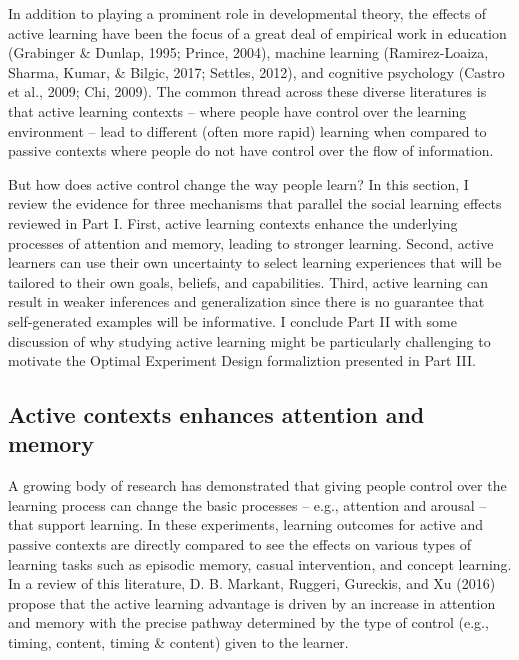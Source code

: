 \documentclass[english,floatsintext,man]{apa6}
\theoremstyle{definition}
\theoremstyle{definition}
\theoremstyle{definition}
\theoremstyle{remark}
\begin{document}
In addition to playing a prominent role in developmental theory, the
effects of active learning have been the focus of a great deal of
empirical work in education (Grabinger \& Dunlap, 1995; Prince, 2004),
machine learning (Ramirez-Loaiza, Sharma, Kumar, \& Bilgic, 2017;
Settles, 2012), and cognitive psychology (Castro et al., 2009; Chi,
2009). The common thread across these diverse literatures is that active
learning contexts -- where people have control over the learning
environment -- lead to different (often more rapid) learning when
compared to passive contexts where people do not have control over the
flow of information.

But how does active control change the way people learn? In this
section, I review the evidence for three mechanisms that parallel the
social learning effects reviewed in Part I. First, active learning
contexts enhance the underlying processes of attention and memory,
leading to stronger learning. Second, active learners can use their own
uncertainty to select learning experiences that will be tailored to
their own goals, beliefs, and capabilities. Third, active learning can
result in weaker inferences and generalization since there is no
guarantee that self-generated examples will be informative. I conclude
Part II with some discussion of why studying active learning might be
particularly challenging to motivate the Optimal Experiment Design
formaliztion presented in Part III.

\subsection{Active contexts enhances attention and
memory}\label{active-contexts-enhances-attention-and-memory}

A growing body of research has demonstrated that giving people control
over the learning process can change the basic processes -- e.g.,
attention and arousal -- that support learning. In these experiments,
learning outcomes for active and passive contexts are directly compared
to see the effects on various types of learning tasks such as episodic
memory, casual intervention, and concept learning. In a review of this
literature, D. B. Markant, Ruggeri, Gureckis, and Xu (2016) propose that
the active learning advantage is driven by an increase in attention and
memory with the precise pathway determined by the type of control (e.g.,
timing, content, timing \& content) given to the learner.
\end{document}

